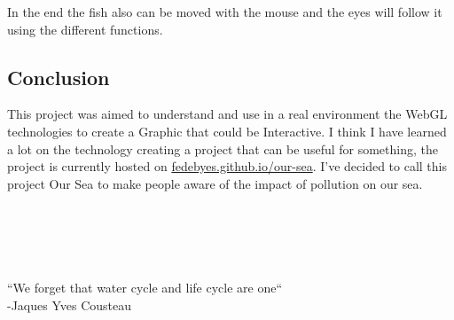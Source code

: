 \documentclass[a4paper,10pt]{article}
\begin{document}
In the end the fish also can be moved with the mouse and the eyes will follow it using the different functions.



\subsection{Conclusion}

This project was aimed to understand and use in a real environment the WebGL technologies to create a Graphic that could be Interactive.
I think I have learned a lot on the technology creating a project that can be useful for something, the project is currently hosted on  \href{https://fedebyes.github.io/our-sea/}{fedebyes.github.io/our-sea}.
I've decided to call this project Our Sea to make people aware of the impact of pollution on our sea. 
\\
\\
\\
\\
\\
\\
{\center \Huge``We forget that water cycle and life cycle are one``\\
\hspace*{\fill}-Jaques Yves Cousteau}
\end{document}
